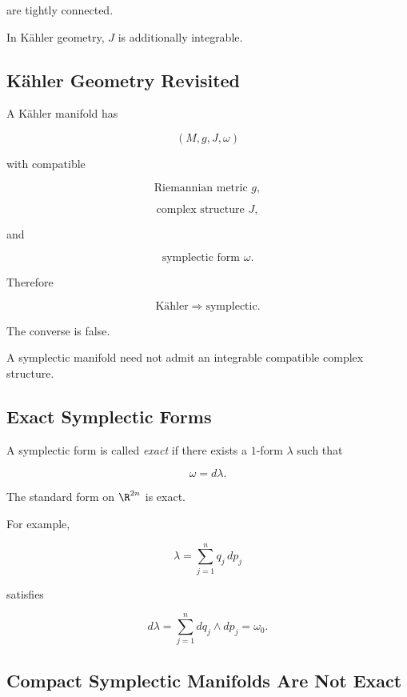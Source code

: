 are tightly connected.

In K\"ahler geometry, \(J\) is additionally integrable.

\subsection{K\"ahler Geometry Revisited}
\label{subsec:symplectic-kahler}

A K\"ahler manifold has

\[
\boxed{
(M,g,J,\omega)
}
\]

with compatible

\[
\text{Riemannian metric }g,
\]

\[
\text{complex structure }J,
\]

and

\[
\text{symplectic form }\omega.
\]

Therefore

\[
\boxed{
\text{K\"ahler}
\Longrightarrow
\text{symplectic}.
}
\]

The converse is false.

A symplectic manifold need not admit an integrable compatible complex
structure.

\subsection{Exact Symplectic Forms}
\label{subsec:exact-symplectic-forms}

A symplectic form is called \emph{exact} if there exists a \(1\)-form
\(\lambda\) such that

\[
\boxed{
\omega=d\lambda.
}
\]

The standard form on \(\R^{2n}\) is exact.

For example,

\[
\lambda
=
\sum_{j=1}^{n}
q_j\,dp_j
\]

satisfies

\[
d\lambda
=
\sum_{j=1}^{n}
dq_j\wedge dp_j
=
\omega_0.
\]

\subsection{Compact Symplectic Manifolds Are Not Exact}
\label{subsec:compact-symplectic-not-exact}

